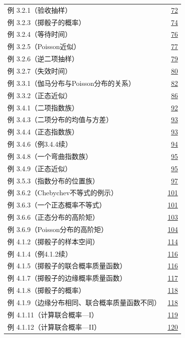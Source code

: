 \begin{longtable}{@{}p{}r@{}}
\addlinespace[.5em]
例 3.2.1（验收抽样） & \hyperref[ex:3.2.1]{72} \\
例 3.2.3（掷骰子的概率） & \hyperref[ex:3.2.3]{74} \\
例 3.2.4（等待时间） & \hyperref[ex:3.2.4]{76} \\
例 3.2.5（Poisson近似） & \hyperref[ex:3.2.5]{77} \\
例 3.2.6（逆二项抽样） & \hyperref[ex:3.2.6]{79} \\
例 3.2.7（失效时间） & \hyperref[ex:3.2.7]{80} \\
例 3.3.1（伽马分布与Poisson分布的关系） & \hyperref[ex:3.3.1]{82} \\
例 3.3.2（正态近似） & \hyperref[ex:3.3.2]{86} \\
例 3.4.1（二项指数族） & \hyperref[ex:3.4.1]{92} \\
例 3.4.3（二项分布的均值与方差） & \hyperref[ex:3.4.3]{93} \\
例 3.4.4（正态指数族） & \hyperref[ex:3.4.4]{93} \\
例 3.4.6（例3.4.4续） & \hyperref[ex:3.4.6]{94} \\
例 3.4.8（一个弯曲指数族） & \hyperref[ex:3.4.8]{95} \\
例 3.4.9（正态近似） & \hyperref[ex:3.4.9]{95} \\
例 3.5.3（指数分布的位置族） & \hyperref[ex:3.5.3]{97} \\
例 3.6.2（Chebychev不等式的例示） & \hyperref[ex:3.6.2]{101} \\
例 3.6.3（一个正态概率不等式） & \hyperref[ex:3.6.3]{101} \\
例 3.6.6（正态分布的高阶矩） & \hyperref[ex:3.6.6]{103} \\
例 3.6.9（Poisson分布的高阶矩） & \hyperref[ex:3.6.9]{104} \\
\addlinespace[.5em]
例 4.1.2（掷骰子的样本空间） & \hyperref[ex:4.1.2]{114} \\
例 4.1.4（例4.1.2续） & \hyperref[ex:4.1.4]{116} \\
例 4.1.5（掷骰子的联合概率质量函数） & \hyperref[ex:4.1.5]{116} \\
例 4.1.7（掷骰子的边缘概率质量函数） & \hyperref[ex:4.1.7]{117} \\
例 4.1.8（掷骰子的概率） & \hyperref[ex:4.1.8]{118} \\
例 4.1.9（边缘分布相同、联合概率质量函数不同） & \hyperref[ex:4.1.9]{118} \\
例 4.1.11（计算联合概率—I） & \hyperref[ex:4.1.11]{119} \\
例 4.1.12（计算联合概率—II） & \hyperref[ex:4.1.12]{120} \\

\end{longtable}
